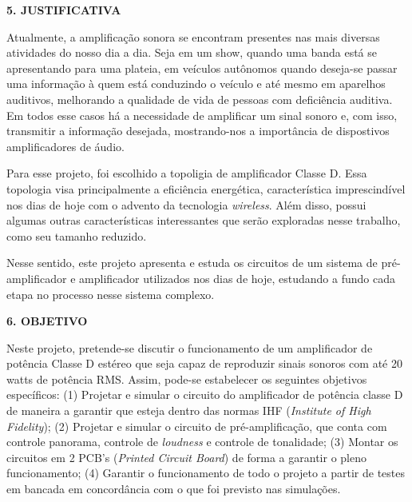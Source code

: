 \documentclass{article}
\begin{document}
\vspace{0.4cm}

\textbf{5. JUSTIFICATIVA}

Atualmente, a amplificação sonora se encontram presentes nas mais diversas atividades do nosso dia a dia. Seja em um
show, quando uma banda está se apresentando para uma plateia, em veículos autônomos quando deseja-se passar uma informação à quem está
conduzindo o veículo e até mesmo em aparelhos auditivos, melhorando a qualidade de vida de pessoas com deficiência auditiva.
Em todos esse casos há a necessidade de amplificar um sinal sonoro e, com isso, transmitir a informação desejada, mostrando-nos a importância
de dispostivos amplificadores de áudio.


Para esse projeto, foi escolhido a topoligia de amplificador Classe D. Essa topologia visa principalmente a eficiência energética, característica imprescindível
nos dias de hoje com o advento da tecnologia \textit{wireless}. Além disso, possui algumas outras características interessantes que serão exploradas nesse trabalho,
como seu tamanho reduzido.


Nesse sentido, este projeto apresenta e estuda os circuitos de um sistema de pré-amplificador e amplificador utilizados nos dias de hoje,
estudando a fundo cada etapa no processo nesse sistema complexo.


\vspace{0.4cm}

\textbf{6. OBJETIVO}

Neste projeto, pretende-se discutir o funcionamento de um amplificador de potência Classe D estéreo que seja capaz de reproduzir sinais sonoros com até 20 watts de 
potência RMS. Assim, pode-se estabelecer os seguintes objetivos específicos: (1) Projetar e simular o circuito do amplificador de potência classe D de maneira a garantir
que esteja dentro das normas IHF (\textit{Institute of High Fidelity}); (2) Projetar e simular o circuito de pré-amplificação, que conta com controle panorama, controle
de \textit{loudness} e controle de tonalidade; (3) Montar os circuitos em 2 PCB's (\textit{Printed Circuit Board}) de forma a garantir o pleno funcionamento; (4) Garantir
o funcionamento de todo o projeto a partir de testes em bancada em concordância com o que foi previsto nas simulações.
\end{document}
